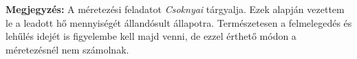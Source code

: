 
%



\begin{formal}
%
%
%
%
%
\textbf{Megjegyzés:} A méretezési feladatot \textit{Csoknyai} \cite[359.~o.]{Herz} tárgyalja. Ezek alapján vezettem le a leadott hő mennyiségét állandósult állapotra. Természetesen a felmelegedés és lehűlés idejét is figyelembe kell majd venni, de ezzel érthető módon a méretezésnél nem számolnak.

\end{formal}
